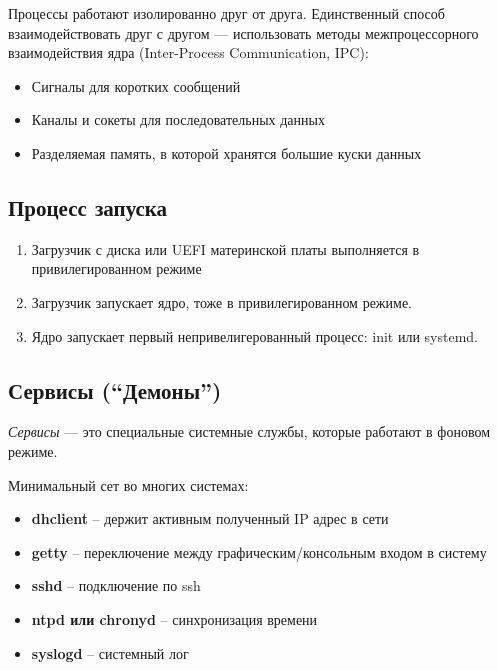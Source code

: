 \begin{multicols}{2}
      Процессы работают изолированно друг от друга. Единственный способ взаимодействовать друг с другом --- использовать методы межпроцессорного взаимодействия ядра (Inter-Process Communication, IPC):

      \begin{itemize}
        \item {Сигналы} для коротких сообщений
        \item {Каналы и сокеты} для последовательных данных
        \item {Разделяемая память}, в которой хранятся большие куски данных
      \end{itemize}

      \subsection*{Процесс запуска}

      \begin{enumerate}
        \item {Загрузчик} с диска или UEFI материнской платы выполняется в привилегированном режиме
        \item Загрузчик запускает {ядро}, тоже в привилегированном режиме.
        \item Ядро запускает первый непривелигерованный процесс: {init или systemd}.
      \end{enumerate}

      \subsection*{Сервисы (``Демоны'')}
      \begin{definition}{}{}
        \textit{Сервисы} --- это специальные системные службы, которые работают в фоновом режиме.
      \end{definition}

      Минимальный сет во многих системах:

      \begin{itemize}
        \item \textbf{dhclient} -- держит активным полученный IP адрес в сети
        \item \textbf{getty} -- переключение между графическим/консольным входом в систему
        \item \textbf{sshd} -- подключение по ssh
        \item \textbf{ntpd или chronyd} -- синхронизация времени
        \item \textbf{syslogd} -- системный лог
      \end{itemize}


\end{multicols}
